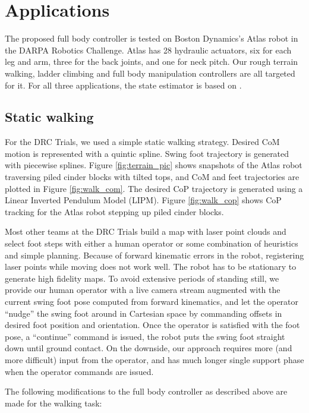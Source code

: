\documentclass{ws-ijhr}
\newcommand{\fref}[1] {Figure \ref{#1}}
\begin{document}
\section{Applications}
\label{sec:trials_tasks}
The proposed full body controller is tested on Boston Dynamics's Atlas robot in 
the DARPA Robotics Challenge. Atlas has 28 hydraulic actuators, six for each leg 
and arm, three for the back joints, and one for neck pitch. Our rough terrain walking, 
ladder climbing and full body manipulation controllers are all targeted for it. 
For all three applications, the state estimator is based on \cite{xinji}.

\subsection{Static walking}
\label{sec:static_walking}
For the DRC Trials, we used a simple static walking strategy. 
Desired CoM motion is represented with a quintic spline. Swing foot trajectory 
is generated with piecewise splines. 
\fref{fig:terrain_pic} shows snapshots of the Atlas robot traversing piled cinder
blocks with tilted tops, and CoM and feet trajectories are plotted in 
\fref{fig:walk_com}. 
The desired CoP trajectory is 
generated using a Linear Inverted Pendulum Model (LIPM). \fref{fig:walk_cop} shows 
CoP tracking for the Atlas robot stepping up piled cinder blocks. 

Most other teams at the DRC Trials
build a map with laser point clouds and select foot steps with either a human 
operator or some combination of heuristics and simple planning. Because of 
forward kinematic errors in the robot, registering laser points while moving
does not work well. The robot has to be stationary to generate high fidelity 
maps. To avoid extensive periods of standing still, we provide our
human operator with a live camera stream augmented with the current swing 
foot pose computed from forward kinematics, and let the operator ``nudge'' 
the swing foot around in Cartesian space by commanding offsets in desired foot 
position and orientation. Once the operator is satisfied with the foot pose, 
a ``continue'' command is issued, the robot puts the swing foot 
straight down until ground contact. On the downside, our approach requires
more (and more difficult) input from the operator, and has much longer single
support phase when the operator commands are issued.

The following modifications to the full body controller as described above are
made for the walking task:
\end{document}
